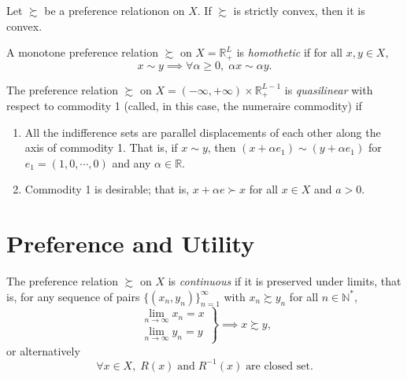 \documentclass[12pt,fleqn]{book} %
\begin{document}
\begin{proposition}
	Let $\succsim$ be a preference relationon on $X$. If $\succsim$ is strictly convex, then it is convex.	
\end{proposition}

\begin{definition}
    A monotone preference relation $\succsim$ on $X=\mathbb{R}_+^L$ is \emph{homothetic} if for all $x,y\in X$,
    \[
    x\sim y \implies \forall \alpha\geqslant 0,\;\alpha x\sim\alpha y.
    \]
\end{definition}

\begin{definition}
	The preference relation $\succsim$ on $X=(-\infty,+\infty)\times\mathbb{R}_+^{L-1}$ is \emph{quasilinear}
	with respect to commodity 1 (called, in this case, the numeraire commodity) if
	\begin{enumerate}
		\item All the indifference sets are parallel displacements of each other along the	axis of commodity 1. That is, if $x \sim y$, then $(x + \alpha e_1) \sim (y + \alpha e_1)$ for $e_1=(1,0,\cdots,0)$ and any $\alpha\in\mathbb{R}$.
		\item Commodity 1 is desirable; that is, $x +\alpha e\succ x$ for all $x\in X$ and $a > 0$.
	\end{enumerate}
\end{definition}


\section{Preference and Utility}

\begin{definition}[Continuity]
    The preference relation $\succsim$ on $X$ is \emph{continuous} if it is preserved under limits, that is, for any sequence of pairs $\{(x_n, y_n)\}_{n=1}^\infty$ with $x_n\succsim y_n$ for all $n\in\mathbb{N^*}$,
    \begin{equation*}
    \left.
    \begin{aligned}
    	\lim_{n\to\infty} x_n=x\\
    	\lim_{n\to\infty} y_n=y
    \end{aligned}
    \right\}
    \implies x\succsim y,
    \end{equation*}
    or alternatively
    \[
    \forall x\in X,\; R(x)\;\text{and}\;R^{-1}(x)\;\text{are closed set}.
    \]
    
\end{definition}
\end{document}
